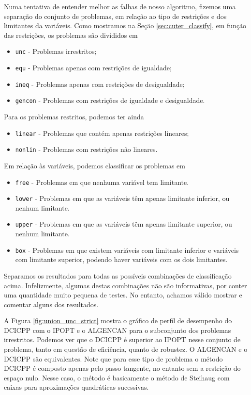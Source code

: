 Numa tentativa de entender melhor as falhas de nosso algoritmo, fizemos uma
separação do conjunto de problemas, em relação ao tipo de restrições e dos
limitantes da variáveis. Como mostramos na Seção
\ref{sec:cuter_classify}, em função das restrições, os problemas são divididos
em
\begin{itemize}
  \item \verb+unc+ - Problemas irrestritos;
  \item \verb+equ+ - Problemas apenas com restrições de igualdade;
  \item \verb+ineq+ - Problemas apenas com restrições de desigualdade;
  \item \verb+gencon+ - Problemas com restrições de igualdade e
    desigualdade.
\end{itemize}
Para os problemas restritos, podemos ter ainda 
\begin{itemize}
  \item \verb+linear+ - Problemas que contém apenas restrições
    lineares;
  \item \verb+nonlin+ - Problemas com restrições não lineares.
\end{itemize}
Em relação às variáveis, podemos classificar os problemas em
\begin{itemize}
  \item \verb+free+ - Problemas em que nenhuma variável tem limitante.
  \item \verb+lower+ - Problemas em que as variáveis têm apenas limitante
    inferior, ou nenhum limitante.
  \item \verb+upper+ - Problemas em que as variáveis têm apenas limitante
    superior, ou nenhum limitante.
  \item \verb+box+ - Problemas em que existem variáveis com limitante inferior e
    variáveis com limitante superior, podendo haver variáveis com os dois
    limitantes.
\end{itemize}
Separamos os resultados para todas as possíveis combinações de classificação
acima. Infelizmente, algumas destas combinações não são informativas, por conter uma
quantidade muito pequena de testes. No entanto, achamos válido mostrar e
comentar alguns dos resultados. 

A Figura \ref{fig:union_unc_strict} mostra o gráfico de perfil de desempenho do
DCICPP com o IPOPT e o ALGENCAN para o subconjunto dos problemas irrestritos.
Podemos ver que o DCICPP é superior ao IPOPT nesse conjunto de problema, tanto
em questão de eficiência, quanto de robustez. O ALGENCAN e o DCICPP são
equivalentes.
Note que para esse tipo de problema o método DCICPP é composto apenas pelo passo
tangente, no entanto sem a restrição do espaço nulo. Nesse caso, o método é
basicamente o método de Steihaug com caixas para aproximações quadráticas
sucessivas.

